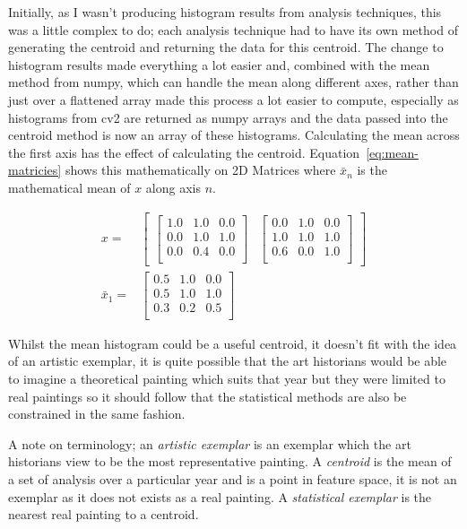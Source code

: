 Initially, as I wasn't producing histogram results from analysis techniques, this was a little
complex to do; each analysis technique had to have its own method of generating the centroid and
returning the data for this centroid. The change to histogram results made everything a lot easier
and, combined with the mean method from numpy, which can handle the mean along 
different axes, rather than just over a flattened array made this process a lot easier to compute,
especially as histograms from \gls{cv2} are returned as numpy arrays and the data passed into the centroid method is now an 
array of these histograms. Calculating the mean across the first axis has the effect of 
calculating the centroid. Equation~\ref{eq:mean-matricies} shows this mathematically on 2D 
Matrices where $\bar{x}_n$ is the mathematical mean of $x$ along axis $n$.

\begin{align}
x=&\begin{bmatrix}
\begin{bmatrix}
1.0 & 1.0 & 0.0 \\
0.0 & 1.0 & 1.0 \\
0.0 & 0.4 & 0.0 \\
\end{bmatrix} & 
\begin{bmatrix}
0.0 & 1.0 & 0.0 \\
1.0 & 1.0 & 1.0 \\
0.6 & 0.0 & 1.0 \\
\end{bmatrix}
\end{bmatrix} \nonumber \\
\bar{x}_1 =& 
\begin{bmatrix}
0.5 & 1.0 & 0.0 \\
0.5 & 1.0 & 1.0 \\
0.3 & 0.2 & 0.5 \\
\end{bmatrix}
\label{eq:mean-matricies}
\end{align}

Whilst the mean histogram could be a useful centroid, it doesn't fit with the idea of an artistic 
exemplar, it is quite possible that the art historians would be able to imagine a theoretical
painting which suits that year but they were limited to real paintings so it should follow that
the statistical methods are also be constrained in the same fashion.

A note on terminology; an \emph{artistic exemplar} is an exemplar which the art historians view
to be the most representative painting. A \emph{centroid} is the mean of a set of analysis over a
particular year and is a point in feature space, it is not an exemplar as it does not exists as a 
real painting. A \emph{statistical exemplar} is the nearest real painting to a centroid.

